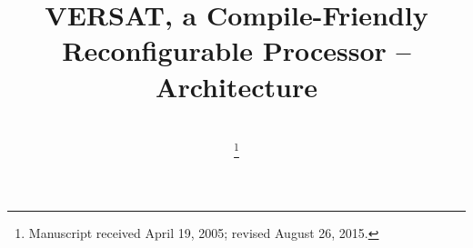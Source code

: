 \documentclass[journal]{IEEEtran}
\begin{document}
%
\title{VERSAT, a Compile-Friendly Reconfigurable Processor -- Architecture}
%
%
%

\author{\\%
\thanks{Manuscript received April 19, 2005; revised August 26, 2015.}}

% 
%
\end{document}
